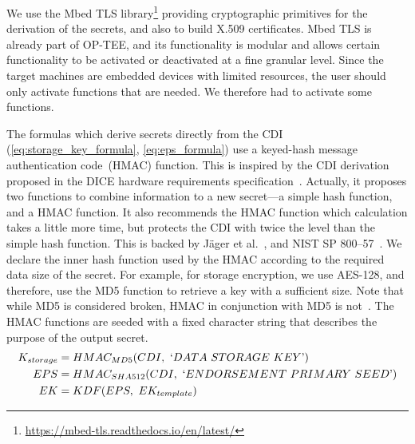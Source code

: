 We use the Mbed TLS library\footnote{\url{https://mbed-tls.readthedocs.io/en/latest/}} providing cryptographic primitives for the derivation of the secrets, and also to build X.509 certificates.
Mbed TLS is already part of OP-TEE, and its functionality is modular and allows certain functionality to be activated or deactivated at a fine granular level.
Since the target machines are embedded devices with limited resources, the user should only activate functions that are needed.
We therefore had to activate some functions.

The formulas which derive secrets directly from the CDI (\autoref{eq:storage_key_formula}, \autoref{eq:eps_formula}) use a keyed-hash message authentication code~(HMAC) function.
This is inspired by the CDI derivation proposed in the DICE hardware requirements specification~\cite{dice-hardware-reqs}.
Actually, it proposes two functions to combine information to a new secret---a simple hash function, and a HMAC function.
It also recommends the HMAC function which calculation takes a little more time, but protects the CDI with twice the level than the simple hash function.
This is backed by Jäger et al.~\cite{Jaeger2017}, and NIST SP 800--57~\cite{Barker2020}.
We declare the inner hash function used by the HMAC according to the required data size of the secret.
For example, for storage encryption, we use AES-128, and therefore, use the MD5 function to retrieve a key with a sufficient size.
Note that while MD5 is considered broken, HMAC in conjunction with MD5 is not~\cite{Bellare2006}.
The HMAC functions are seeded with a fixed character string that describes the purpose of the output secret.
\begin{align}
  \label{eq:storage_key_formula}
  K_{storage} &= HMAC_{MD5}(CDI,\ `DATA\ STORAGE\ KEY\text{'})\\
  \label{eq:eps_formula}
  EPS &= HMAC_{SHA512}(CDI,\ `ENDORSEMENT\ PRIMARY\ SEED\text{'})\\
  \label{eq:ek_formula}
  EK  &= KDF(EPS,\ EK_{template})
\end{align}



